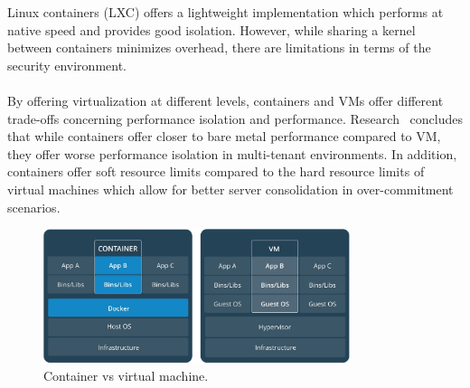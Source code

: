 Linux containers (LXC) offers a lightweight implementation which performs at native speed and provides good isolation. However, while sharing a kernel between containers minimizes overhead, there are limitations in terms of the security environment.~\cite{dua2014virtualization}
\\\\
\noindent By offering virtualization at different levels, containers and VMs offer different trade-offs concerning performance isolation and performance. Research~\cite{SharmaPrateek2016CaVM} concludes that while containers offer closer to bare metal performance compared to VM, they offer worse performance isolation in multi-tenant environments. In addition, containers offer soft resource limits compared to the hard resource limits of virtual machines which allow for better server consolidation in over-commitment scenarios.  
\begin{figure}[h]
\caption{Container vs virtual machine.~\cite{container-vs-vms}}
\centering
\includegraphics[width=0.8\textwidth]{chapter-background/containervsvm.pdf}
\end{figure}
